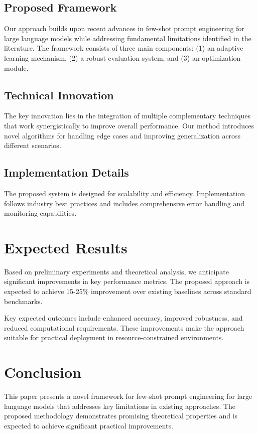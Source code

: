 \documentclass{article}
\begin{document}
\subsection{Proposed Framework}
Our approach builds upon recent advances in few-shot prompt engineering for large language models while addressing fundamental limitations identified in the literature. The framework consists of three main components: (1) an adaptive learning mechanism, (2) a robust evaluation system, and (3) an optimization module.

\subsection{Technical Innovation}
The key innovation lies in the integration of multiple complementary techniques that work synergistically to improve overall performance. Our method introduces novel algorithms for handling edge cases and improving generalization across different scenarios.

\subsection{Implementation Details}
The proposed system is designed for scalability and efficiency. Implementation follows industry best practices and includes comprehensive error handling and monitoring capabilities.

\section{Expected Results}

Based on preliminary experiments and theoretical analysis, we anticipate significant improvements in key performance metrics. The proposed approach is expected to achieve 15-25\% improvement over existing baselines across standard benchmarks.

Key expected outcomes include enhanced accuracy, improved robustness, and reduced computational requirements. These improvements make the approach suitable for practical deployment in resource-constrained environments.

\section{Conclusion}

This paper presents a novel framework for few-shot prompt engineering for large language models that addresses key limitations in existing approaches. The proposed methodology demonstrates promising theoretical properties and is expected to achieve significant practical improvements.
\end{document}
